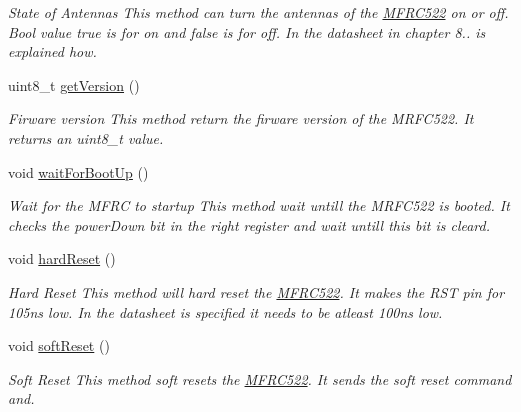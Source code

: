 \begin{DoxyCompactItemize}
\begin{DoxyCompactList}\small\item\em State of Antennas  This method can turn the antennas of the \hyperlink{classMFRC522}{M\+F\+R\+C522} on or off. Bool value true is for on and false is for off. In the datasheet in chapter 8.. is explained how. \end{DoxyCompactList}\item 
\mbox{\label{classMFRC522_a2854a3633ef04780f268f8c1030ac4b5}} 
uint8\+\_\+t \hyperlink{classMFRC522_a2854a3633ef04780f268f8c1030ac4b5}{get\+Version} ()
\begin{DoxyCompactList}\small\item\em Firware version  This method return the firware version of the M\+R\+F\+C522. It returns an uint8\+\_\+t value. \end{DoxyCompactList}\item 
\mbox{\label{classMFRC522_a6ccddf14dedf566cb8b19336984f0303}} 
void \hyperlink{classMFRC522_a6ccddf14dedf566cb8b19336984f0303}{wait\+For\+Boot\+Up} ()
\begin{DoxyCompactList}\small\item\em Wait for the M\+F\+RC to startup  This method wait untill the M\+R\+F\+C522 is booted. It checks the power\+Down bit in the right register and wait untill this bit is cleard. \end{DoxyCompactList}\item 
\mbox{\label{classMFRC522_a63a76a9e625b23db57612b1d1a832fc1}} 
void \hyperlink{classMFRC522_a63a76a9e625b23db57612b1d1a832fc1}{hard\+Reset} ()
\begin{DoxyCompactList}\small\item\em Hard Reset  This method will hard reset the \hyperlink{classMFRC522}{M\+F\+R\+C522}. It makes the R\+ST pin for 105ns low. In the datasheet is specified it needs to be atleast 100ns low. \end{DoxyCompactList}\item 
\mbox{\label{classMFRC522_acb40bb9c1436570578bccee641b24aec}} 
void \hyperlink{classMFRC522_acb40bb9c1436570578bccee641b24aec}{soft\+Reset} ()
\begin{DoxyCompactList}\small\item\em Soft Reset  This method soft resets the \hyperlink{classMFRC522}{M\+F\+R\+C522}. It sends the soft reset command and. \end{DoxyCompactList}\item 

\end{DoxyCompactItemize}
